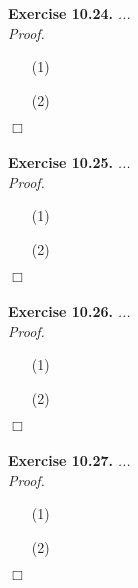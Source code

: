 \documentclass{article}
\begin{document}



\textbf{Exercise 10.24.}
\emph{...} \\

\emph{Proof.}
\begin{enumerate}
\item[(1)]
\item[(2)]

\end{enumerate}
$\Box$ \\\\






\textbf{Exercise 10.25.}
\emph{...} \\

\emph{Proof.}
\begin{enumerate}
\item[(1)]
\item[(2)]

\end{enumerate}
$\Box$ \\\\






\textbf{Exercise 10.26.}
\emph{...} \\

\emph{Proof.}
\begin{enumerate}
\item[(1)]
\item[(2)]

\end{enumerate}
$\Box$ \\\\






\textbf{Exercise 10.27.}
\emph{...} \\

\emph{Proof.}
\begin{enumerate}
\item[(1)]
\item[(2)]

\end{enumerate}
$\Box$ \\\\
\end{document}
